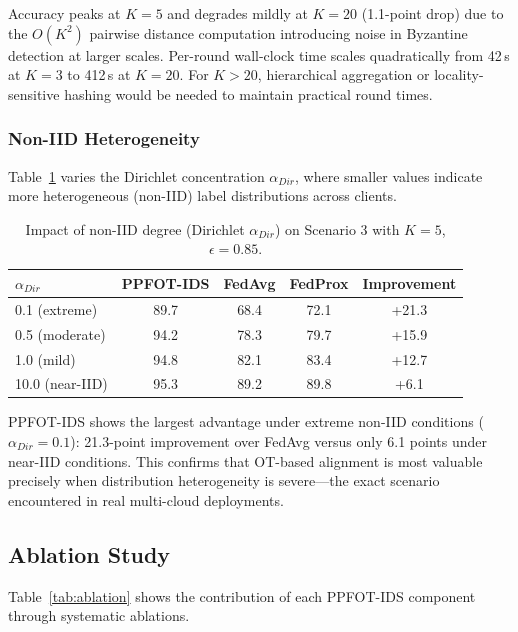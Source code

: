 \documentclass{ieeeaccess}
\theoremstyle{plain}
\theoremstyle{definition}
\theoremstyle{remark}
\begin{document}
Accuracy peaks at $K = 5$ and degrades mildly at $K = 20$ (1.1-point drop) due to the $O(K^2)$ pairwise distance computation introducing noise in Byzantine detection at larger scales. Per-round wall-clock time scales quadratically from 42\,s at $K = 3$ to 412\,s at $K = 20$. For $K > 20$, hierarchical aggregation or locality-sensitive hashing would be needed to maintain practical round times.

\subsubsection{Non-IID Heterogeneity}

Table~\ref{tab:noniid} varies the Dirichlet concentration $\alpha_{Dir}$, where smaller values indicate more heterogeneous (non-IID) label distributions across clients.

\begin{table}[!t]
\renewcommand{\arraystretch}{1.2}
\caption{Impact of non-IID degree (Dirichlet $\alpha_{Dir}$) on Scenario 3 with $K = 5$, $\epsilon = 0.85$.}
\label{tab:noniid}
\centering
\begin{tabular}{lcccc}
\hline
$\alpha_{Dir}$ & \textbf{PPFOT-IDS} & \textbf{FedAvg} & \textbf{FedProx} & \textbf{Improvement} \\
\hline
0.1 (extreme) & 89.7 & 68.4 & 72.1 & +21.3 \\
0.5 (moderate) & 94.2 & 78.3 & 79.7 & +15.9 \\
1.0 (mild) & 94.8 & 82.1 & 83.4 & +12.7 \\
10.0 (near-IID) & 95.3 & 89.2 & 89.8 & +6.1 \\
\hline
\end{tabular}
\end{table}

PPFOT-IDS shows the largest advantage under extreme non-IID conditions ($\alpha_{Dir} = 0.1$): 21.3-point improvement over FedAvg versus only 6.1 points under near-IID conditions. This confirms that OT-based alignment is most valuable precisely when distribution heterogeneity is severe---the exact scenario encountered in real multi-cloud deployments.

\subsection{Ablation Study}

Table~\ref{tab:ablation} shows the contribution of each PPFOT-IDS component through systematic ablations.
\end{document}
